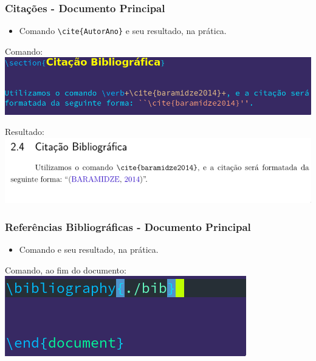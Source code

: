\documentclass{beamer}
\begin{document}
\begin{frame}[fragile]

  \frametitle{Citações - Documento Principal}

  \begin{itemize}
  \item Comando \verb_\cite{AutorAno}_ e seu resultado, na prática.
  \end{itemize}


  \begin{center}
    Comando: \\
    \includegraphics[scale=0.30]{../Imagens/A2I111.png}


    Resultado: \\
    \includegraphics[scale=0.40]{../Imagens/A2I112.png}
  \end{center}

\end{frame}

\begin{frame}[fragile]
  \frametitle{Referências Bibliográficas - Documento Principal}
  \begin{itemize}
  \item Comando \verb__ e seu resultado, na prática.
  \end{itemize}
  \begin{center}
    Comando, ao fim do documento:
    \includegraphics[scale=0.60]{../Imagens/A2I122.png}
  \end{center}

\end{frame}
\end{document}
